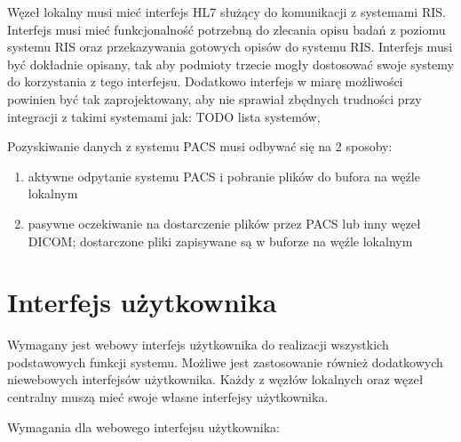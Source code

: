 \documentclass[a4paper]{report}
\begin{document}
Węzeł lokalny musi mieć interfejs HL7 służący do komunikacji z systemami RIS. Interfejs musi mieć funkcjonalność potrzebną do zlecania opisu badań z poziomu systemu RIS oraz przekazywania gotowych opisów do systemu RIS. Interfejs musi być dokładnie opisany, tak aby podmioty trzecie mogły dostosować swoje systemy do korzystania z tego interfejsu. Dodatkowo interfejs w miarę możliwości powinien być tak zaprojektowany, aby nie sprawiał zbędnych trudności przy integracji z takimi systemami jak: TODO lista systemów, 

Pozyskiwanie danych z systemu PACS musi odbywać się na 2 sposoby:
\begin{enumerate}
  \item aktywne odpytanie systemu PACS i pobranie plików do bufora na węźle lokalnym
  \item pasywne oczekiwanie na dostarczenie plików przez PACS lub inny węzeł DICOM; dostarczone pliki zapisywane są w buforze na węźle lokalnym
\end{enumerate}

\section{Interfejs użytkownika}

Wymagany jest webowy interfejs użytkownika do realizacji wszystkich podstawowych funkcji systemu. Możliwe jest zastosowanie również dodatkowych niewebowych interfejsów użytkownika. Każdy z węzłów lokalnych oraz węzeł centralny muszą mieć swoje własne interfejsy użytkownika.

Wymagania dla webowego interfejsu użytkownika:
\end{document}
